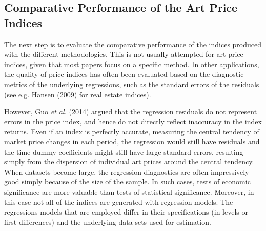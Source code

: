 \documentclass[12pt,]{article}
\begin{document}
\begin{table}[ht]
\centering
\caption{Correlations in growth rates (dlogs)} 
\end{table}

\subsection{Comparative Performance of the Art Price
Indices}\label{comparative-performance-of-the-art-price-indices}

The next step is to evaluate the comparative performance of the indices
produced with the different methodologies. This is not usually attempted
for art price indices, given that most papers focus on a specific
method. In other applications, the quality of price indices has often
been evaluated based on the diagnostic metrics of the underlying
regressions, such as the standard errors of the residuals (see e.g.
Hansen (2009) for real estate indices).

However, Guo \emph{et al.} (2014) argued that the regression residuals
do not represent errors in the price index, and hence do not directly
reflect inaccuracy in the index returns. Even if an index is perfectly
accurate, measuring the central tendency of market price changes in each
period, the regression would still have residuals and the time dummy
coefficients might still have large standard errors, resulting simply
from the dispersion of individual art prices around the central
tendency. When datasets become large, the regression diagnostics are
often impressively good simply because of the size of the sample. In
such cases, tests of economic significance are more valuable than tests
of statistical significance. Moreover, in this case not all of the
indices are generated with regression models. The regressions models
that are employed differ in their specifications (in levels or first
differences) and the underlying data sets used for estimation.
\end{document}
